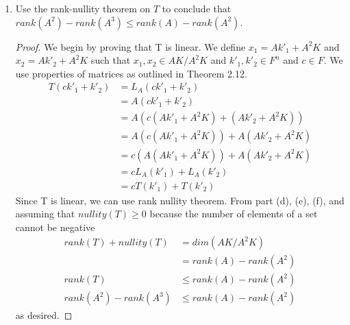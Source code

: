 \documentclass[11pt]{scrartcl}
\begin{document}
\begin{enumerate}[label=\alph*.]
{\begin{proof}
		      To show that $R(T) = A^2K/A^3K$, is another way of saying show that $T$ is onto.
		      We must show that $\forall x \in AK/A^2K [\exists y \in A^2K/A^3K : T(x) = y$].
		      Let $x = Ak' + A^2K$ where $k' \in \mathbb{F}^n$.
		      \begin{align*}
			      T(x) & = T(Ak' + A^2K)              \\
			           & = L_A(Ak' + A^2K)            \\
			           & = L_A(Ak') + L_A(A^2K)       \\
			           & = A^2k' + A^3K \in A^2K/A^3K
		      \end{align*}
		      Therefore, $T$ is onto and $R(T) = A^2K/A^3K$.
	      \end{proof}
	      }
	\item{
	      Use the rank-nullity theorem on $T$ to conclude that $rank(A^2) - rank(A^3) \leq rank(A) - rank(A^2)$.
	      \begin{proof}
		      We begin by proving that T is linear. We define $x_1 = Ak'_1 + A^2K$ and $x_2 = Ak'_2 + A^2K$
		      such that $x_1, x_2 \in AK/A^2K$ and $k'_1, k'_2 \in F^n$ and $c \in F$. We use properties of matrices
		      as outlined in Theorem 2.12.
		      \begin{align*}
			      T(ck'_1 + k'_2) & = L_A(ck'_1 + k'_2)                    \\
			                      & = A(ck'_1 + k'_2)                      \\
			                      & = A(c(Ak'_1 + A^2K) + (Ak'_2 + A^2K))  \\
			                      & = A(c(Ak'_1 + A^2K)) + A(Ak'_2 + A^2K) \\
			                      & = c(A(Ak'_1 + A^2K)) + A(Ak'_2 + A^2K) \\
			                      & = cL_A(k'_1)+ L_A(k'_2)                \\
			                      & = cT(k'_1)+ T(k'_2)
		      \end{align*}
		      Since T is linear, we can use rank nullity theorem. From part (d), (e), (f), and assuming that $nullity(T) \geq 0$ because the number of elements of a set cannot be negative
		      \begin{align*}
			      rank(T) + nullity(T)  & = dim(AK/A^2K)           \\
			                            & = rank(A) - rank(A^2)    \\
			      rank(T)               & \leq rank(A) - rank(A^2) \\
			      rank(A^2) - rank(A^3) & \leq rank(A) - rank(A^2)
		      \end{align*}
		      as desired.
	      \end{proof}
	      }
\end{enumerate}
\end{document}

